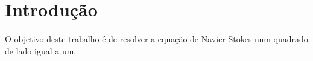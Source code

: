 \documentclass[introducao.tex]{subfiles}
\begin{document}
\section{Introdução}
\paragraph{} O objetivo deste trabalho é de resolver a equação de Navier Stokes num quadrado de lado igual a um.
\end{document}
